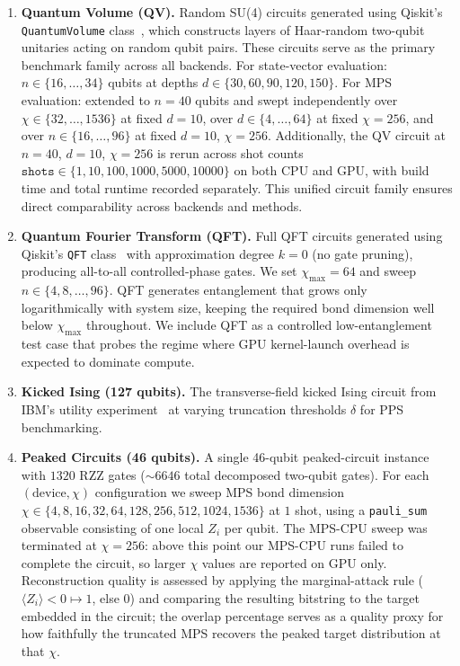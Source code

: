 \documentclass[conference,10pt]{IEEEtran}
\begin{document}
    \begin{enumerate}
        \item \textbf{Quantum Volume (QV).} Random SU(4) circuits generated using Qiskit's \texttt{QuantumVolume} class~\cite{cross2019validating, qiskit2024}, which constructs layers of Haar-random two-qubit unitaries acting on random qubit pairs. These circuits serve as the primary benchmark family across all backends. For state-vector evaluation: $n \in \{16, \ldots, 34\}$ qubits at depths $d \in \{30, 60, 90, 120, 150\}$. For MPS evaluation: extended to $n = 40$ qubits and swept independently over $\chi \in \{32, \ldots, 1536\}$ at fixed $d = 10$, over $d \in \{4, \ldots, 64\}$ at fixed $\chi = 256$, and over $n \in \{16, \ldots, 96\}$ at fixed $d = 10$, $\chi = 256$. Additionally, the QV circuit at $n = 40$, $d = 10$, $\chi = 256$ is rerun across shot counts $\texttt{shots} \in \{1, 10, 100, 1000, 5000, 10000\}$ on both CPU and GPU, with build time and total runtime recorded separately. This unified circuit family ensures direct comparability across backends and methods.
     
        \item \textbf{Quantum Fourier Transform (QFT).} Full QFT circuits generated using Qiskit's \texttt{QFT} class~\cite{qiskit2024} with approximation degree $k = 0$ (no gate pruning), producing all-to-all controlled-phase gates. We set $\chi_{\max} = 64$ and sweep $n \in \{4, 8, \ldots, 96\}$. QFT generates entanglement that grows only logarithmically with system size, keeping the required bond dimension well below $\chi_{\max}$ throughout. We include QFT as a controlled low-entanglement test case that probes the regime where GPU kernel-launch overhead is expected to dominate compute.
     
        \item \textbf{Kicked Ising (127 qubits).} The transverse-field kicked Ising circuit from IBM's utility experiment~\cite{kim2023evidence} at varying truncation thresholds $\delta$ for PPS benchmarking.
     
        \item \textbf{Peaked Circuits (46 qubits).} A single 46-qubit peaked-circuit \cite{aaronson2024verifiablequantumadvantagepeaked} instance with $1320 \text{ RZZ}$ gates ($\sim$$6646$ total decomposed two-qubit gates). For each $(\text{device}, \chi)$ configuration we sweep MPS bond dimension $\chi \in \{4, 8, 16, 32, 64, 128, 256, 512, 1024, 1536\}$ at $1$ shot, using a \texttt{pauli\_sum} observable consisting of one local $Z_i$ per qubit. The MPS-CPU sweep was terminated at $\chi = 256$: above this point our MPS-CPU runs failed to complete the circuit, so larger $\chi$ values are reported on GPU only. Reconstruction quality is assessed by applying the marginal-attack rule ($\langle Z_i \rangle < 0 \mapsto 1$, else $0$) \cite{gharibyan2025heuristicquantumadvantagepeaked} and comparing the resulting bitstring to the target embedded in the circuit; the overlap percentage serves as a quality proxy for how faithfully the truncated MPS recovers the peaked target distribution at that $\chi$.
    \end{enumerate}
    
\end{document}
